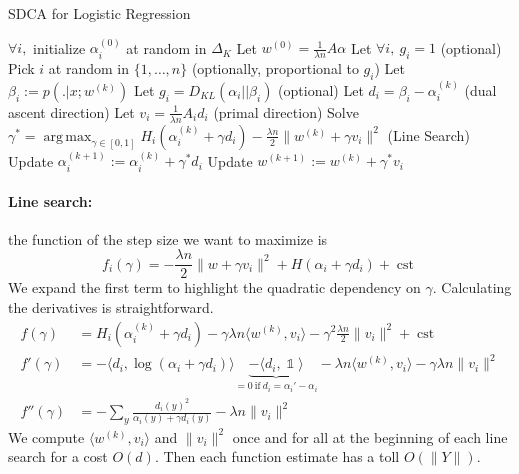 \documentclass{article}
\DeclareMathOperator{\cst}{cst}
\DeclareMathOperator{\1}{\mathbb{1}}
\DeclareMathOperator*{\argmax}{arg\,max}
\begin{document}
\begin{algorithm}[ht]
    \caption{SDCA for Logistic Regression}%
    \label{sdca for logreg}
\begin{algorithmic}
        \STATE $\forall i,$ initialize $\alpha_i^{(0)}$ at random in $\Delta_K$
        \STATE Let $w^{(0)} = \frac{1}{\lambda n} A \alpha$  
        \STATE Let $\forall i,\  g_i = 1$ (optional)
                \STATE Pick $i$ at random in $\{1,\ldots,n\}$ (optionally, proportional to $g_i$)
                \STATE Let $ \beta_i := p( . |x ; w^{(k)})$
                \STATE Let $g_i = D_{KL}(\alpha_i || \beta_i)$ (optional)
                \STATE Let $d_i = \beta_i - \alpha_i^{(k)}$ (dual ascent direction)
                \STATE Let $v_i = \frac{1}{\lambda n} A_i d_i $ (primal direction)
                \STATE Solve $\gamma^* = \argmax_{\gamma \in [0,1]} H_i(\alpha_i^{(k)} + \gamma d_i) - \frac{\lambda n}{2} \| w^{(k)} + \gamma v_i \|^2$ (Line Search)
               \STATE Update $\alpha_i^{(k+1)} := \alpha_i^{(k)} + \gamma^* d_i$
               \STATE Update $w^{(k+1)} := w^{(k)} + \gamma^* v_i $
        \ENDFOR
\end{algorithmic}
\end{algorithm}


\paragraph{Line search:} 
the function of the step size we want to maximize is 
\begin{equation*}
	\label{line search 1}
	f_i(\gamma) = -\frac{\lambda n}{2} \|w + \gamma v_i\|^2 + H(\alpha_i + \gamma d_i) + \cst
\end{equation*}
We expand the first term to highlight the quadratic dependency on $\gamma$.
Calculating the derivatives is straightforward.
\begin{align*}
	f(\gamma)
	& = H_i(\alpha_i^{(k)} + \gamma d_i)
	- \gamma \lambda n  \langle w^{(k)} , v_i \rangle 
	- \gamma^2 \frac{\lambda n}{2} \|v_i \|^2
	+ \cst
	\\
	f'(\gamma) & =  - \langle d_i, \log(\alpha_i + \gamma d_i) \rangle
	\underbrace{ -  \langle d_i, \1 \rangle}_{=0 \ \mathrm{if} \ d_i=\alpha_i' - \alpha_i}
	- \lambda n \langle w^{(k)} , v_i \rangle 
	- \gamma \lambda n \|v_i \|^2 
	\\
	f''(\gamma) & = - \sum_{y} \frac{d_{i}(y)^2 }{ \alpha_i(y) + \gamma d_i(y) }
	- \lambda n  \|v_i \|^2 
\end{align*}
We compute $\langle w^{(k)} , v_i \rangle$ and $ \|v_i \|^2$ once and for all at the beginning of each line search for a cost $O(d)$. Then each function estimate has a toll $O(\|Y\|)$.
\end{document}
